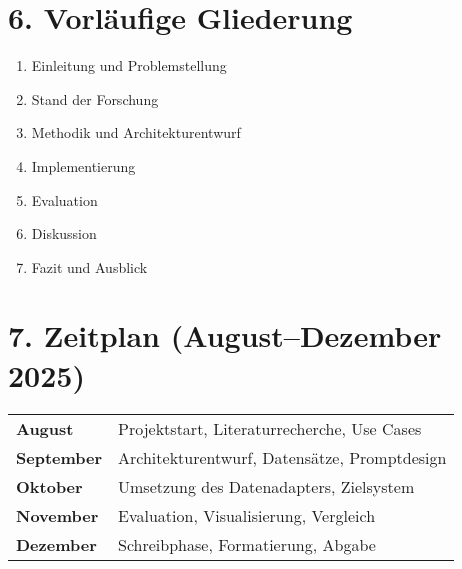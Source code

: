 \documentclass[12pt,a4paper]{scrartcl}
\begin{document}
\section*{6. Vorläufige Gliederung}

\begin{enumerate}
  \item Einleitung und Problemstellung
  \item Stand der Forschung
  \item Methodik und Architekturentwurf
  \item Implementierung
  \item Evaluation
  \item Diskussion
  \item Fazit und Ausblick
\end{enumerate}

\section*{7. Zeitplan (August–Dezember 2025)}

\begin{tabular}{ll}
\textbf{August}   & Projektstart, Literaturrecherche, Use Cases \\
\textbf{September} & Architekturentwurf, Datensätze, Promptdesign \\
\textbf{Oktober}   & Umsetzung des Datenadapters, Zielsystem \\
\textbf{November}  & Evaluation, Visualisierung, Vergleich \\
\textbf{Dezember}  & Schreibphase, Formatierung, Abgabe \\
\end{tabular}

\printbibliography
\end{document}
